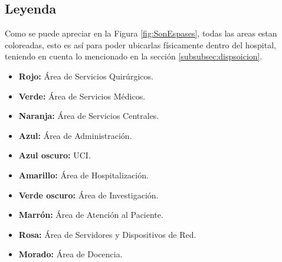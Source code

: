 \subsection{Leyenda}
Como se puede apreciar en la Figura \ref{fig:SonEspases}, todas las areas estan coloreadas, esto es así para poder 
ubicarlas físicamente dentro del hospital, teniendo en cuenta lo mencionado en la sección \ref{subsubsec:dispsoicion}. 

\begin{itemize}
    \item \textbf{Rojo:} Área de Servicios Quirúrgicos.
    \item \textbf{Verde:} Área de Servicios Médicos.
    \item \textbf{Naranja:} Área de Servicios Centrales.
    \item \textbf{Azul:} Área de Administración.
    \item \textbf{Azul oscuro:} UCI.
    \item \textbf{Amarillo:} Área de Hospitalización.
    \item \textbf{Verde oscuro:} Área de Investigación.
    \item \textbf{Marrón:} Área de Atención al Paciente.
    \item \textbf{Rosa:} Área de Servidores y Dispositivos de Red.
    \item \textbf{Morado:} Área de Docencia.
\end{itemize}
